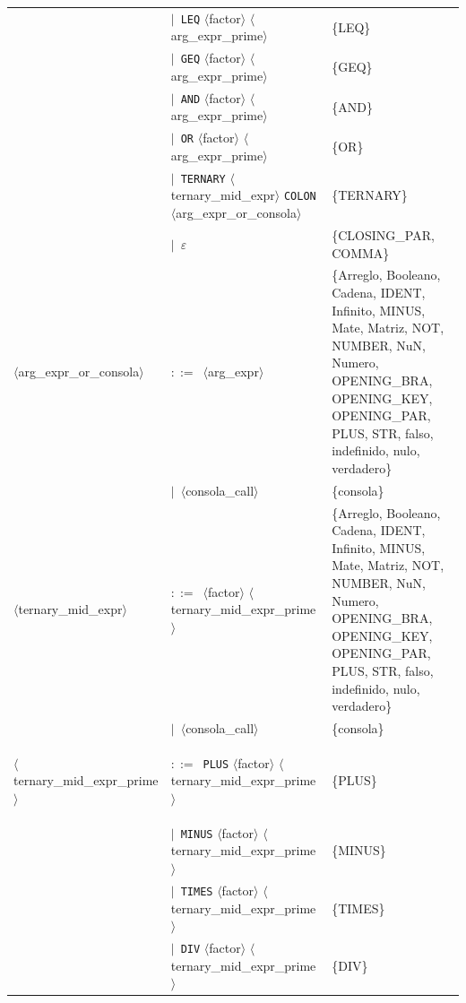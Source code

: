 \documentclass[10pt]{article}
\begin{document}
{\begin{longtable}{@{} p{2.0cm} p{6.9cm} p{6.9cm} @{}}
   & $\mid$~\texttt{LEQ} $\langle$factor$\rangle$ $\langle$arg\_expr\_prime$\rangle$ & \{LEQ\} \\
   & $\mid$~\texttt{GEQ} $\langle$factor$\rangle$ $\langle$arg\_expr\_prime$\rangle$ & \{GEQ\} \\
   & $\mid$~\texttt{AND} $\langle$factor$\rangle$ $\langle$arg\_expr\_prime$\rangle$ & \{AND\} \\
   & $\mid$~\texttt{OR} $\langle$factor$\rangle$ $\langle$arg\_expr\_prime$\rangle$ & \{OR\} \\
   & $\mid$~\texttt{TERNARY} $\langle$ternary\_mid\_expr$\rangle$ \texttt{COLON} $\langle$arg\_expr\_or\_consola$\rangle$ & \{TERNARY\} \\
   & $\mid$~$\varepsilon$ & \{CLOSING\_PAR, COMMA\} \\
  \midrule
  \textcolor{ntcolor}{\parbox[t]{1.8cm}{\raggedright$\langle$arg\_\allowbreak{}expr\_\allowbreak{}or\_\allowbreak{}consola$\rangle$}} & $::=$~$\langle$arg\_expr$\rangle$ & \{Arreglo, Booleano, Cadena, IDENT, Infinito, MINUS, Mate, Matriz, NOT, NUMBER, NuN, Numero, OPENING\_BRA, OPENING\_KEY, OPENING\_PAR, PLUS, STR, falso, indefinido, nulo, verdadero\} \\
   & $\mid$~$\langle$consola\_call$\rangle$ & \{consola\} \\
  \midrule
  \textcolor{ntcolor}{\parbox[t]{1.8cm}{\raggedright$\langle$ternary\_\allowbreak{}mid\_\allowbreak{}expr$\rangle$}} & $::=$~$\langle$factor$\rangle$ $\langle$ternary\_mid\_expr\_prime$\rangle$ & \{Arreglo, Booleano, Cadena, IDENT, Infinito, MINUS, Mate, Matriz, NOT, NUMBER, NuN, Numero, OPENING\_BRA, OPENING\_KEY, OPENING\_PAR, PLUS, STR, falso, indefinido, nulo, verdadero\} \\
   & $\mid$~$\langle$consola\_call$\rangle$ & \{consola\} \\
  \midrule
  \textcolor{ntcolor}{\parbox[t]{1.8cm}{\raggedright$\langle$ternary\_\allowbreak{}mid\_\allowbreak{}expr\_\allowbreak{}prime$\rangle$}} & $::=$~\texttt{PLUS} $\langle$factor$\rangle$ $\langle$ternary\_mid\_expr\_prime$\rangle$ & \{PLUS\} \\
   & $\mid$~\texttt{MINUS} $\langle$factor$\rangle$ $\langle$ternary\_mid\_expr\_prime$\rangle$ & \{MINUS\} \\
   & $\mid$~\texttt{TIMES} $\langle$factor$\rangle$ $\langle$ternary\_mid\_expr\_prime$\rangle$ & \{TIMES\} \\
   & $\mid$~\texttt{DIV} $\langle$factor$\rangle$ $\langle$ternary\_mid\_expr\_prime$\rangle$ & \{DIV\} \\

\end{longtable}}
\end{document}
